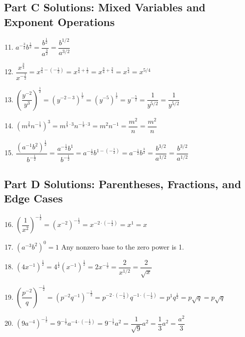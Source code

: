 \documentclass[14pt]{extarticle}
\begin{document}
\subsection*{Part C Solutions: Mixed Variables and Exponent Operations}
\begin{enumerate}
  \setcounter{enumi}{10}
  \item \(a^{-\frac{3}{2}} b^{\frac{1}{2}}
  = \dfrac{b^{\frac{1}{2}}}{a^{\frac{3}{2}}}
  = \boxed{\dfrac{b^{1/2}}{a^{3/2}}}\)

  \item \(\dfrac{x^{\frac{3}{4}}}{x^{-\frac{1}{2}}}
  = x^{\frac{3}{4} - \left(-\frac{1}{2}\right)}
  = x^{\frac{3}{4} + \frac{1}{2}}
  = x^{\frac{3}{4} + \frac{2}{4}}
  = x^{\frac{5}{4}}
  = \boxed{x^{5/4}}\)

  \item \(\left(\dfrac{y^{-2}}{y^3}\right)^{\frac{1}{2}}
  = \left(y^{-2-3}\right)^{\frac{1}{2}}
  = (y^{-5})^{\frac{1}{2}}
  = y^{-\frac{5}{2}}
  = \dfrac{1}{y^{5/2}}
  = \boxed{\dfrac{1}{y^{5/2}}}\)

  \item \((m^{\frac{2}{3}} n^{-\frac{1}{3}})^3
  = m^{\frac{2}{3} \cdot 3} n^{-\frac{1}{3} \cdot 3}
  = m^{2} n^{-1}
  = \dfrac{m^2}{n}
  = \boxed{\dfrac{m^2}{n}}\)

  \item \(\dfrac{(a^{-1} b^{2})^{\frac{1}{2}}}{b^{-\frac{1}{2}}}
  = \dfrac{a^{-\frac{1}{2}} b^{1}}{b^{-\frac{1}{2}}}
  = a^{-\frac{1}{2}} b^{1 - \left(-\frac{1}{2}\right)}
  = a^{-\frac{1}{2}} b^{\frac{3}{2}}
  = \dfrac{b^{3/2}}{a^{1/2}}
  = \boxed{\dfrac{b^{3/2}}{a^{1/2}}}\)
\end{enumerate}

\subsection*{Part D Solutions: Parentheses, Fractions, and Edge Cases}
\begin{enumerate}
  \setcounter{enumi}{15}
  \item \(\left(\dfrac{1}{x^2}\right)^{-\frac{1}{2}}
  = (x^{-2})^{-\frac{1}{2}}
  = x^{-2 \cdot \left(-\frac{1}{2}\right)}
  = x^{1}
  = \boxed{x}\)

  \item \((a^{-3} b^2)^0 = \boxed{1}\)  
  Any nonzero base to the zero power is 1.

  \item \((4x^{-1})^{\frac{1}{2}}
  = 4^{\frac{1}{2}} (x^{-1})^{\frac{1}{2}}
  = 2 x^{-\frac{1}{2}}
  = \dfrac{2}{x^{1/2}}
  = \boxed{\dfrac{2}{\sqrt{x}}}\)

  \item \(\left(\dfrac{p^{-2}}{q}\right)^{-\frac{1}{2}}
  = (p^{-2} q^{-1})^{-\frac{1}{2}}
  = p^{-2 \cdot \left(-\frac{1}{2}\right)} q^{-1 \cdot \left(-\frac{1}{2}\right)}
  = p^{1} q^{\frac{1}{2}}
  = p \sqrt{q}
  = \boxed{p\sqrt{q}}\)

  \item \((9a^{-4})^{-\frac{1}{2}}
  = 9^{-\frac{1}{2}} a^{-4 \cdot \left(-\frac{1}{2}\right)}
  = 9^{-\frac{1}{2}} a^{2}
  = \dfrac{1}{\sqrt{9}} a^{2}
  = \dfrac{1}{3} a^{2}
  = \boxed{\dfrac{a^2}{3}}\)
\end{enumerate}
\end{document}
